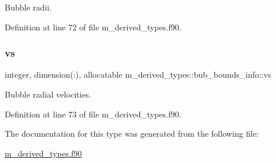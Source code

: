 Bubble radii. 



Definition at line 72 of file m\+\_\+derived\+\_\+types.\+f90.

\mbox{\label{structm__derived__types_1_1bub__bounds__info_aafe6965d5ebb0a946bda443cfdd6b840}} 
\subsubsection{\texorpdfstring{vs}{vs}}
{\footnotesize\ttfamily integer, dimension(\+:), allocatable m\+\_\+derived\+\_\+types\+::bub\+\_\+bounds\+\_\+info\+::vs}



Bubble radial velocities. 



Definition at line 73 of file m\+\_\+derived\+\_\+types.\+f90.



The documentation for this type was generated from the following file\+:\begin{DoxyCompactItemize}
\item 
\hyperlink{m__derived__types_8f90}{m\+\_\+derived\+\_\+types.\+f90}\end{DoxyCompactItemize}
